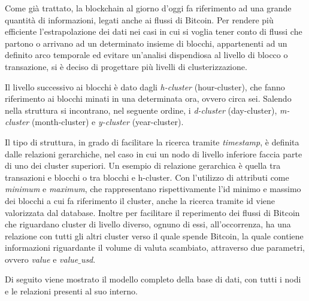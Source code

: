 Come già trattato, la blockchain al giorno d'oggi fa riferimento ad una grande quantità di informazioni, legati anche ai flussi di Bitcoin.
Per rendere più efficiente l'estrapolazione dei dati nei casi in cui si voglia tener conto di flussi che partono o arrivano ad un determinato insieme di blocchi, appartenenti ad un definito arco temporale ed evitare un'analisi dispendiosa  al livello di blocco o transazione, si è deciso di progettare più livelli di clusterizzazione.

Il livello successivo ai blocchi è dato dagli \emph{h-cluster} (hour-cluster), che fanno riferimento ai blocchi minati in una determinata ora, ovvero circa sei.
Salendo nella struttura si incontrano, nel seguente ordine, i \emph{d-cluster} (day-cluster), \emph{m-cluster} (month-cluster) e \emph{y-cluster} (year-cluster).

Il tipo di struttura, in grado di facilitare la ricerca tramite \emph{timestamp}, è definita dalle relazioni gerarchiche,
nel caso in cui un nodo di livello inferiore faccia parte di uno dei cluster superiori.
Un esempio di relazione gerarchica è quella tra transazioni e blocchi o tra blocchi e h-cluster. 
Con l'utilizzo di attributi come \emph{minimum} e \emph{maximum}, che rappresentano rispettivamente l'id minimo e massimo dei blocchi a cui fa riferimento il cluster, anche la ricerca tramite id viene valorizzata dal database.
Inoltre per facilitare il reperimento dei flussi di Bitcoin che riguardano cluster di livello diverso, ognuno di essi, all'occorrenza, ha una relazione con tutti gli altri cluster verso il quale spende Bitcoin, la quale contiene informazioni riguardante il volume di valuta scambiato, attraverso due parametri, ovvero \emph{value} e \emph{value$\_$usd}.

Di seguito viene mostrato il modello completo della base di dati, con tutti i nodi e le relazioni presenti al suo interno.

\thispagestyle{mystyle}

